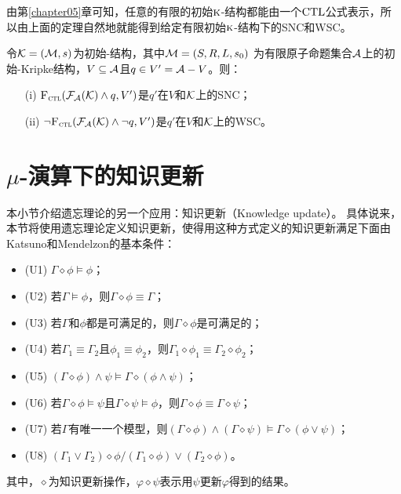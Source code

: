 由第\ref{chapter05}章可知，任意的有限的初始$\textsc{k}$-结构都能由一个$\textrm{CTL}$公式表示，所以由上面的定理自然地就能得到给定有限初始$\textsc{k}$-结构下的SNC和WSC。
\begin{corollary}\label{thm:inK:SNC}
	令${\cal K}= ({\cal M}, s)$为初始\MPK-结构，其中${\cal M}=(S,R,L,s_0)$ 为有限原子命题集合${\cal A}$上的初始-Kripke结构，$V \subseteq {\cal A}$且$q\in V' = {\cal A} - V$。则：
	\begin{itemize}
		\item[(i)] ${\textsc{F}_{\textsc{ctl}}}({\cal F}_{{\cal A}}({\cal K}) \wedge q, V')$是$q'$在$V$和${\cal K}$上的SNC；
		\item[(ii)] $\neg {\textsc{F}_{\textsc{ctl}}}({\cal F}_{{\cal A}}({\cal K}) \wedge \neg q, V')$是$q'$在$V$和${\cal K}$上的WSC。
	\end{itemize}
\end{corollary}

\section{$\mu$-演算下的知识更新}\label{sec:chapter07-knowledge-update}
本小节介绍遗忘理论的另一个应用：知识更新（Knowledge update）。
具体说来，本节将使用遗忘理论定义知识更新，使得用这种方式定义的知识更新满足下面由Katsuno和Mendelzon的基本条件：
\begin{itemize}
	\item (U1)  $\Gamma \diamond \phi \models \phi$；
	\item (U2) 若$\Gamma \models \phi$，则$\Gamma \diamond \phi \equiv \Gamma$；
	\item (U3) 若$\Gamma$和$\phi$都是可满足的，则$\Gamma \diamond \phi$是可满足的；
	\item (U4) 若$\Gamma_1\equiv \Gamma_2$且$\phi_1 \equiv \phi_2$，则$\Gamma_1 \diamond \phi_1 \equiv \Gamma_2 \diamond \phi_2$；
	\item (U5) $(\Gamma \diamond \phi) \wedge \psi \models \Gamma \diamond(\phi \wedge \psi)$；
	\item (U6) 若$\Gamma \diamond \phi \models \psi$且$\Gamma \diamond \psi \models \phi$，则$\Gamma \diamond \phi \equiv \Gamma \diamond \psi$；
	\item (U7) 若$\Gamma$有唯一一个模型，则$(\Gamma \diamond \phi) \wedge (\Gamma \diamond \psi) \models \Gamma \diamond (\phi \vee \psi)$；
	\item (U8) $(\Gamma_1 \vee \Gamma_2) \diamond \phi                                                                                                                    / (\Gamma_1 \diamond \phi) \vee  (\Gamma_2 \diamond \phi)$。
\end{itemize}
其中，$\diamond$为知识更新操作，$\varphi \diamond \psi$表示用$\psi$更新$\varphi$得到的结果。

